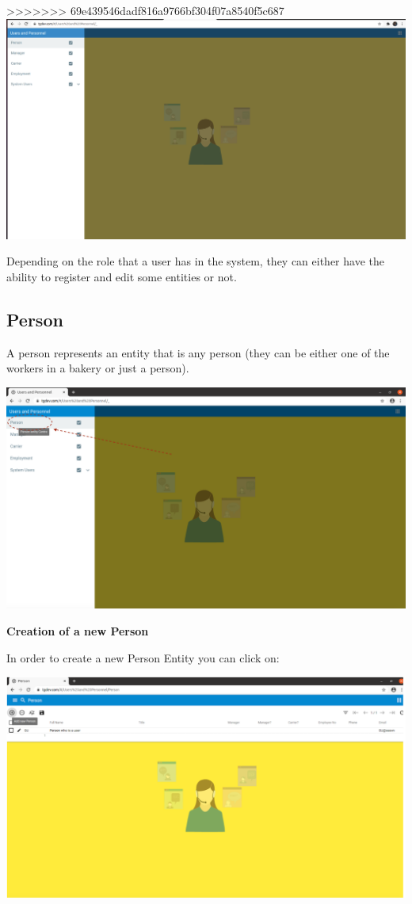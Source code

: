 >>>>>>> 69e439546dadf816a9766bf304f07a8540f5c687
\includegraphics[width=\textwidth]{sections/01-chapter/images/personnel.png}



Depending on the role that a user has in the system, they can either have the ability to register and edit some entities or not. 

\subsection{Person}
A person represents an entity that is any person (they can be either one of the workers in a bakery or just a person).

\includegraphics[width=\textwidth]{sections/01-chapter/images/person11.png}

\textbf{Creation of a new Person}

In order to create a new Person Entity you can click on: 

\includegraphics[width=\textwidth]{sections/01-chapter/images/person2.png}

